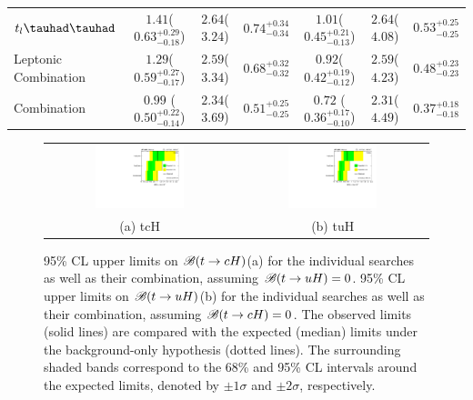 \begin{table}[t!]
\begin{center}
{\begin{tabular}{lcccccc}
$t_l\thadhad$                   &$1.41$($0.63^{+0.29}_{-0.18}$) &$2.64$($3.24$)   &$0.74^{+0.34}_{-0.34}$  & $1.01$($0.45^{+0.21}_{-0.13}$) & $2.64$($4.08$)  &$0.53^{+0.25}_{-0.25}$\\
Leptonic Combination            &$1.29$($0.59^{+0.27}_{-0.17}$) &$2.59$($3.34$)   &$0.68^{+0.32}_{-0.32}$  & $0.92$($0.42^{+0.19}_{-0.12}$) & $2.59$($4.23$)  &$0.48^{+0.23}_{-0.23}$\\
\midrule
Combination                     &$0.99$ ($0.50^{+0.22}_{-0.14}$)&$2.34$($3.69$)   &$0.51^{+0.25}_{-0.25}$ & $0.72$ ($0.36^{+0.17}_{-0.10}$)& $2.31$($4.49$)&$0.37^{+0.18}_{-0.18}$  \\
\bottomrule\bottomrule
\end{tabular}
}
\label{tab:limits_summary}
\end{center}
\end{table}






\begin{figure}[h!]
\begin{center}
\begin{tabular}{@{}cc@{}}
\includegraphics[width=0.49\textwidth]{figures/tcH_Limits.pdf}&
\includegraphics[width=0.49\textwidth]{figures/tuH_Limits.pdf}\\
(a) tcH & (b) tuH \\
\end{tabular}
\caption{\small {95\% CL upper limits on $\mathscr{B}(t\to cH)$(a) for the individual searches as well as their
combination, assuming $\mathscr{B}(t\to uH)=0$. 95\% CL upper limits on $\mathscr{B}(t\to uH)$(b) for the individual searches as well as their
combination, assuming $\mathscr{B}(t\to cH)=0$. The observed limits (solid lines) are compared with the 
expected (median) limits under the background-only hypothesis (dotted lines). The surrounding shaded bands correspond to the 68\% and 95\% CL intervals around the expected limits, 
denoted by $\pm 1\sigma$ and $\pm 2\sigma$, respectively.
}}
\label{fig:limits_combo_1D_hc} 
\end{center}
\end{figure}


